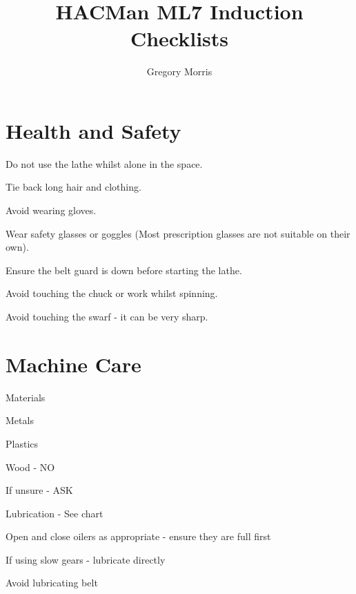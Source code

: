 \documentclass[11pt,a5paper,twoside,openany]{book}
\title{\textbf{HACMan ML7 Induction Checklists}}
\author{Gregory Morris}
\date{}
\newenvironment{checklist}{
  \begin{list}{}{}
  
}{%
  \end{list}
}
\begin{document}
\maketitle
\chapter{Health and Safety}
\begin{checklist}
\item Do not use the lathe whilst alone in the space.
\item Tie back long hair and clothing.
\item Avoid wearing gloves.
\item Wear safety glasses or goggles (Most prescription glasses are not suitable on their own).
\item Ensure the belt guard is down before starting the lathe.
\item Avoid touching the chuck or work whilst spinning.
\item Avoid touching the swarf - it can be very sharp.
\end{checklist}


\chapter{Machine Care}
\begin{checklist}
\item Materials
	\begin{checklist}
	\item Metals
	\item Plastics
	\item Wood - NO
	\item If unsure - ASK
	\end{checklist}
\item Lubrication - See chart
\item Open and close oilers as appropriate - ensure they are full first
\item If using slow gears - lubricate directly
\item Avoid lubricating belt
\end{checklist}
\end{document}
